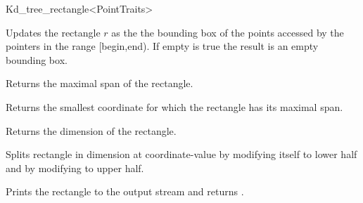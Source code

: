 \begin{ccRefClass}{Kd_tree_rectangle<PointTraits>}
\begin{ccAdvanced}
{Updates the rectangle $r$ as the the bounding box of the points accessed by the pointers
 in the range [begin,end). If empty is true the result is an empty bounding box.} 
 
{Returns the maximal span of the rectangle.}

{Returns the smallest coordinate for which the rectangle has its maximal span.}

{Returns the dimension of the rectangle.}

{Splits rectangle in dimension  at coordinate-value  
 by modifying itself to lower half and by modifying  to upper half.} 


{Prints the rectangle  to the output stream  and returns .}


\end{ccAdvanced}


\end{ccRefClass}


